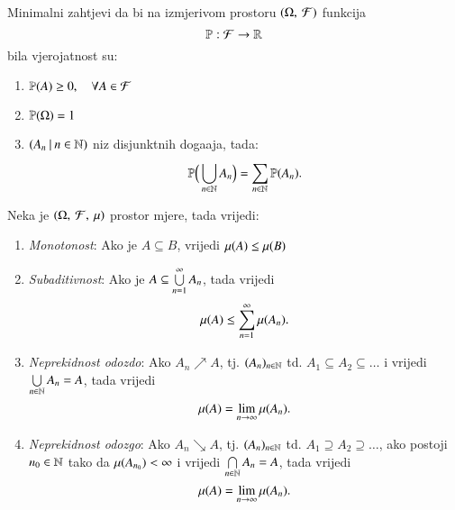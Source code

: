 \begin{nap}
\begin{enumerate}[label=(\alph*)]
        Minimalni zahtjevi da bi na izmjerivom prostoru $(\Omega, \: \mathcal{F})$ funkcija
        \begin{equation*}
            \mathbb{P}: \mathcal{F} \to \mathbb{R}
        \end{equation*}
        bila vjerojatnost su:
        \begin{enumerate}[label=(\roman*)]
            \item $\mathbb{P}({A}) \geq 0, \quad \forall A \in \mathcal{F}$
            \item $\mathbb{P}({\Omega}) = 1$
            \item $({A_n} \: | \: {n \in \mathbb{N}})$ niz disjunktnih doga\dj aja, tada:
            \begin{equation*}
                \mathbb{P} \Big( \bigcup\limits_{n \in \mathbb{N}}^{} A_n \Big) = \sum\limits_{n \in \mathbb{N}}^{} \mathbb{P}({A_n}).
            \end{equation*}
        \end{enumerate}
    \end{enumerate}
\end{nap}

\begin{tm} \label{tm:1.24-1}
    Neka je $(\Omega, \: \mathcal{F}, \: \mu)$ prostor mjere, tada vrijedi:
    \begin{enumerate}[label={(\roman*)}]
        \item \label{tm:1.24-1.1}
        \emph{Monotonost}: Ako je $A \subseteq B$, vrijedi 
            $\mu({A}) \leq \mu({B})$
        \item \emph{Subaditivnost}: Ako je $A \subseteq \bigcup\limits_{n=1}^{\infty} A_n$, tada
            vrijedi
            \begin{equation*}
                \mu({A}) \leq \sum\limits_{n=1}^{\infty} \mu({A_n}).
            \end{equation*}
        \item \label{tm:1.24-1.3}
        \emph{Neprekidnost odozdo}: Ako $A_n \nearrow A$, 
            tj. $(A_n)_{n \in \mathbb{N}}$ td. $A_1 \subseteq A_2 \subseteq \dots$ i vrijedi
            $\bigcup\limits_{n \in \mathbb{N}}^{} A_n = A$, tada vrijedi
            \begin{equation*}
                \mu({A}) =
            \lim\limits_{n \to \infty} \mu({A_n}).
            \end{equation*}
        \item \emph{Neprekidnost odozgo}: Ako $A_n \searrow A$, tj. $(A_n)_{n \in \mathbb{N}}$ td.
            $A_1 \supseteq A_2 \supseteq \dots$, ako postoji $n_0 \in \mathbb{N}$ tako da
            $\mu({A_{n_0}}) < \infty$ i vrijedi $\bigcap\limits_{n \in \mathbb{N}}^{} A_n = A$,
            tada vrijedi
            \begin{equation*}
                \mu({A}) = \lim\limits_{n \to \infty} \mu({A_n}).
            \end{equation*}
    \end{enumerate}
\end{tm}

